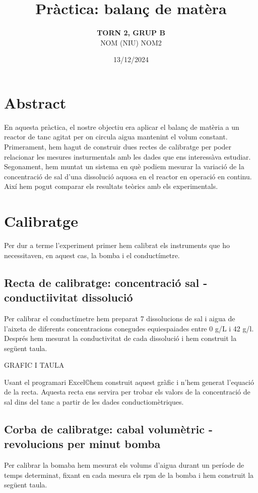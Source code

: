 \documentclass[11pt]{article}
\title{\Huge\bfseries Pràctica: balanç de matèra \\ [2ex] \Large}
\author{\begin{tabular}{c}
\textbf{TORN 2, GRUP B} \\
NOM (NIU)
NOM2
\end{tabular}}
\date{13/12/2024}
\begin{document}
\maketitle

\section{Abstract}
En aquesta pràctica, el nostre objectiu era aplicar el balanç de matèria a un reactor de tanc agitat per on circula aigua mantenint el volum constant. Primerament, hem hagut de construir dues rectes de calibratge per poder relacionar les mesures insturmentals amb les dades que ens interessàva estudiar. Segonament, hem muntat un sistema en què podiem mesurar la variació de la concentració de sal d'una dissolució aquosa en el reactor en operació en continu. Així hem pogut comparar els resultats teòrics amb els experimentals.

\section{Calibratge}
Per dur a terme l'experiment primer hem calibrat els instruments que ho necessitaven, en aquest cas, la bomba i el conductímetre. 

\subsection{Recta de calibratge: concentració sal - conductiivitat dissolució}
Per calibrar el conductímetre hem preparat 7 dissolucions de sal i aigua de l'aixeta de diferents concentracions conegudes equiespaiades entre 0 g/L i 42 g/l. Després hem mesurat la conductivitat de cada dissolució i hem construit la següent taula.


GRAFIC I TAULA

Usant el programari Excel\copyright hem construit aquest gràfic i n'hem generat l'equació de la recta.
Aquesta recta ens servira per trobar els valors de la concentració de sal dins del tanc a partir de les dades conductiomètriques.

\subsection{Corba de calibratge: cabal volumètric - revolucions per minut bomba}
Per calibrar la bomaba hem mesurat els volums d'aigua durant un període de temps determinat, fixant en cada mesura els rpm de la bomba i hem construit la següent taula.
\end{document}

